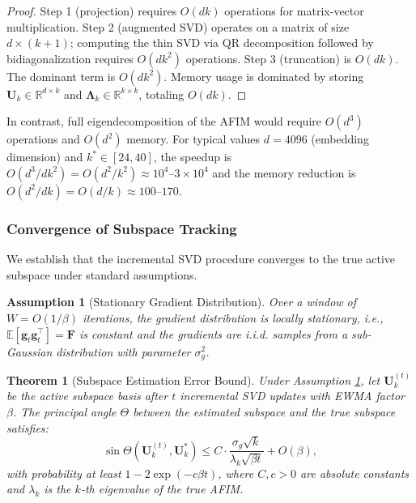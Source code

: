 ﻿\documentclass[lettersize,journal]{IEEEtran}
\newtheorem{theorem}{Theorem}
\newtheorem{assumption}{Assumption}
\begin{document}
\begin{proof}
Step 1 (projection) requires $O(dk)$ operations for matrix-vector multiplication. Step 2 (augmented SVD) operates on a matrix of size $d \times (k+1)$; computing the thin SVD via QR decomposition followed by bidiagonalization requires $O(dk^2)$ operations. Step 3 (truncation) is $O(dk)$. The dominant term is $O(dk^2)$. Memory usage is dominated by storing $\mathbf{U}_k \in \mathbb{R}^{d \times k}$ and $\boldsymbol{\Lambda}_k \in \mathbb{R}^{k \times k}$, totaling $O(dk)$.
\end{proof}

In contrast, full eigendecomposition of the AFIM would require $O(d^3)$ operations and $O(d^2)$ memory. For typical values $d = 4096$ (embedding dimension) and $k^* \in [24, 40]$, the speedup is $O(d^3 / dk^2) = O(d^2/k^2) \approx 10^4\text{--}3 \times 10^4$ and the memory reduction is $O(d^2 / dk) = O(d/k) \approx 100\text{--}170$.

\subsubsection{Convergence of Subspace Tracking}
\label{sec:subspace_convergence}

We establish that the incremental SVD procedure converges to the true active subspace under standard assumptions.

\begin{assumption}[Stationary Gradient Distribution]
\label{ass:stationary}
Over a window of $W = O(1/\beta)$ iterations, the gradient distribution is locally stationary, i.e., $\mathbb{E}[\mathbf{g}_t \mathbf{g}_t^\top] = \mathbf{F}$ is constant and the gradients are i.i.d. samples from a sub-Gaussian distribution with parameter $\sigma_g^2$.
\end{assumption}

\begin{theorem}[Subspace Estimation Error Bound]
\label{thm:subspace_error}
Under Assumption \ref{ass:stationary}, let $\mathbf{U}_k^{(t)}$ be the active subspace basis after $t$ incremental SVD updates with EWMA factor $\beta$. The principal angle $\Theta$ between the estimated subspace and the true subspace satisfies:
\begin{equation}
\label{eq:subspace_error}
\sin \Theta\left(\mathbf{U}_k^{(t)}, \mathbf{U}_k^*\right) \leq C \cdot \frac{\sigma_g \sqrt{k}}{\lambda_k \sqrt{\beta t}} + O(\beta),
\end{equation}
with probability at least $1 - 2\exp(-c \beta t)$, where $C, c > 0$ are absolute constants and $\lambda_k$ is the $k$-th eigenvalue of the true AFIM.
\end{theorem}
\end{document}
